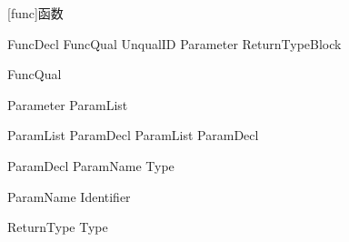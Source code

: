 
[func]{函数}

\begin{bnf}{FuncDecl}
    FuncQual\bnfs {} UnqualID Parameter ReturnType\bnfq Block
\end{bnf}

\begin{bnf}{FuncQual}
     \br
\end{bnf}

\begin{bnf}{Parameter}
    \terminal{(} ParamList\bnfq \terminal{)}
\end{bnf}

\begin{bnf}{ParamList}
    ParamDecl \br
    ParamList \terminal{,} ParamDecl
\end{bnf}

\begin{bnf}{ParamDecl}
    ParamName \terminal{:} Type\bnfq
\end{bnf}

\begin{bnf}{ParamName}
    Identifier \br
\end{bnf}

\begin{bnf}{ReturnType}
    \terminal{->} Type
\end{bnf}